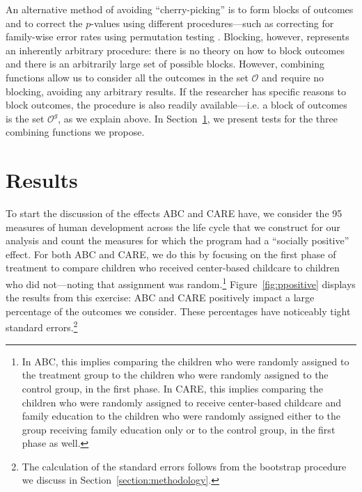 \noindent An alternative method of avoiding ``cherry-picking'' is to form blocks of outcomes and to correct the $p$-values using different procedures---such as correcting for family-wise error rates using permutation testing \citep{Lehmann_Romano_2005_testing,Romano_Shaikh_2006_AnnStat,Heckman_Moon_etal_2010_QE}. Blocking, however, represents an inherently arbitrary procedure: there is no theory on how to block outcomes and there is an arbitrarily large set of possible blocks. However, combining functions allow us to consider all the outcomes in the set $\mathcal{O}$ and require no blocking, avoiding any arbitrary results. If the researcher has specific reasons to block outcomes, the procedure is also readily available---i.e. a block of outcomes is the set $\mathcal{O}^g$, as we explain above. In Section~\ref{section:results}, we present tests for the three combining functions we propose.

\section{Results} \label{section:results}

\noindent To start the discussion of the effects ABC and CARE have, we consider the 95 measures of human development across the life cycle that we construct for our analysis and count the measures for which the program had a ``socially positive'' effect. For both ABC and CARE, we do this by focusing on the first phase of treatment to compare children who received center-based childcare to children who did not---noting that assignment was random.\footnote{In ABC, this implies comparing the children who were randomly assigned to the treatment group to the children who were randomly assigned to the control group, in the first phase. In CARE, this implies comparing the children who were randomly assigned to receive center-based childcare and family education to the children who were randomly assigned either to the group receiving family education only or to the control group, in the first phase as well.} Figure~\ref{fig:ppositive} displays the results from this exercise: ABC and CARE positively impact a large percentage of the outcomes we consider. These percentages have noticeably tight standard errors.\footnote{The calculation of the standard errors follows from the bootstrap procedure we discuss in Section~\ref{section:methodology}.}

